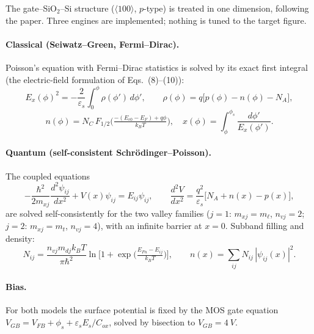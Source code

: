 \documentclass[11pt]{article}
\begin{document}
The gate--SiO$_2$--Si structure ($\langle100\rangle$, $p$-type) is treated in
one dimension, following the paper. Three engines are implemented; nothing is
tuned to the target figure.

\paragraph{Classical (Seiwatz--Green, Fermi--Dirac).}
Poisson's equation with Fermi--Dirac statistics is solved by its exact first
integral (the electric-field formulation of Eqs.~(8)--(10)):
\begin{equation}
E_x(\phi)^2=-\frac{2}{\varepsilon_s}\int_0^{\phi}\rho(\phi')\,d\phi',\qquad
\rho(\phi)=q\big[p(\phi)-n(\phi)-N_A\big],
\end{equation}
\begin{equation}
n(\phi)=N_C\,F_{1/2}\!\Big(\tfrac{-(E_{c0}-E_F)+q\phi}{k_BT}\Big),\quad
x(\phi)=\int_\phi^{\phi_s}\frac{d\phi'}{E_x(\phi')} .
\end{equation}

\paragraph{Quantum (self-consistent Schr\"odinger--Poisson).}
The coupled equations
\begin{equation}
-\frac{\hbar^2}{2m_{xj}}\frac{d^2\psi_{ij}}{dx^2}+V(x)\psi_{ij}=E_{ij}\psi_{ij},
\qquad
\frac{d^2V}{dx^2}=\frac{q^2}{\varepsilon_s}\big[N_A+n(x)-p(x)\big],
\end{equation}
are solved self-consistently for the two valley families
($j{=}1$: $m_{xj}=m_\ell$, $n_{vj}=2$; $j{=}2$: $m_{xj}=m_t$, $n_{vj}=4$),
with an infinite barrier at $x{=}0$. Subband filling and density:
\begin{equation}
N_{ij}=\frac{n_{vj}m_{dj}k_BT}{\pi\hbar^2}
\ln\!\Big[1+\exp\!\Big(\tfrac{E_{Fn}-E_{ij}}{k_BT}\Big)\Big],
\qquad
n(x)=\sum_{ij}N_{ij}\,|\psi_{ij}(x)|^2 .
\end{equation}

\paragraph{Bias.}
For both models the surface potential is fixed by the MOS gate equation
$V_{GB}=V_{FB}+\phi_s+\varepsilon_s E_s/C_{ox}$, solved by bisection to
$V_{GB}=\SI{4}{V}$.
\end{document}
